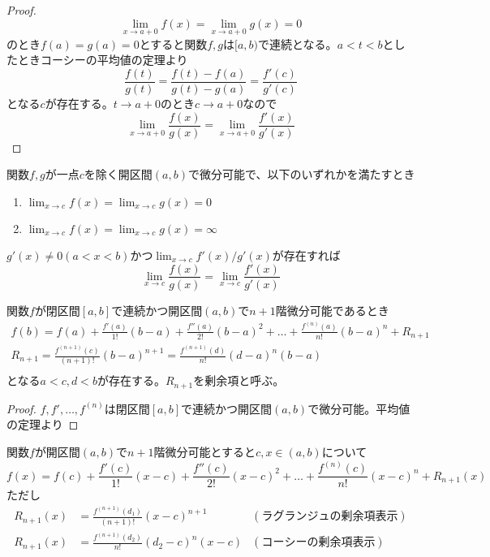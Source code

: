 \begin{proof}
		\[\lim_{x \to a+0} f(x) = \lim_{x \to a+0} g(x) = 0\]
	のとき$f(a) = g(a) = 0$とすると関数$f,g$は$[a, b)$で連続となる。$a < t < b$としたときコーシーの平均値の定理より
		\[\frac{f(t)}{g(t)} = \frac{f(t) - f(a)}{g(t) - g(a)} = \frac{f'(c)}{g'(c)}\]
	となる$c$が存在する。$t \to a+0$のとき$c \to a+0$なので
		\[\lim_{x \to a+0} \frac{f(x)}{g(x)} = \lim_{x \to a+0} \frac{f'(x)}{g'(x)}\]
\end{proof}
\begin{cor}
	関数$f,g$が一点$c$を除く開区間$(a, b)$で微分可能で、以下のいずれかを満たすとき
	\begin{enumerate}
		\item $\lim_{x \to c} f(x) = \lim_{x \to c} g(x) = 0$
		\item $\lim_{x \to c} f(x) = \lim_{x \to c} g(x) = \infty$
	\end{enumerate}
	$g'(x) \neq 0(a < x < b)$かつ$\lim_{x \to c} f'(x)/g'(x)$が存在すれば
		\[\lim_{x \to c} \frac{f(x)}{g(x)} = \lim_{x \to c} \frac{f'(x)}{g'(x)}\]
\end{cor}

\begin{thm}[テイラーの定理]
	関数$f$が閉区間$[a, b]$で連続かつ開区間$(a, b)$で$n+1$階微分可能であるとき
	\begin{gather*}
		f(b) = f(a) + \frac{f'(a)}{1!}(b - a) + \frac{f''(a)}{2!}(b - a)^2 + \dots + \frac{f^{(n)}(a)}{n!}(b - a)^n + R_{n+1}\\
		R_{n+1} = \frac{f^{(n+1)}(c)}{(n+1)!}(b - a)^{n+1} = \frac{f^{(n+1)}(d)}{n!}(d - a)^n(b - a)\\
	\end{gather*}
	となる$a < c,d < b$が存在する。$R_{n+1}$を剰余項と呼ぶ。
\end{thm}
\begin{proof}
	$f, f', \dots, f^{(n)}$は閉区間$[a, b]$で連続かつ開区間$(a, b)$で微分可能。平均値の定理より
\end{proof}

\begin{cor}
	関数$f$が開区間$(a, b)$で$n+1$階微分可能とすると$c, x \in (a, b)$について
		\[f(x) = f(c) + \frac{f'(c)}{1!}(x - c) + \frac{f''(c)}{2!}(x - c)^2 + \dots + \frac{f^{(n)}(c)}{n!}(x - c)^n + R_{n+1}(x)\]
	ただし
	\begin{align*}
		R_{n+1}(x) &= \frac{f^{(n+1)}(d_1)}{(n+1)!}(x - c)^{n+1} & (ラグランジュの剰余項表示)\\
		R_{n+1}(x) &= \frac{f^{(n+1)}(d_2)}{n!}(d_2 - c)^n(x - c) & (コーシーの剰余項表示)\\
	\end{align*}
\end{cor}

